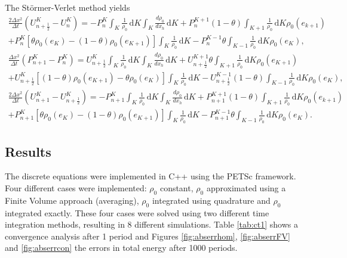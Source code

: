 \documentclass{article}
\begin{document}
The St\"{o}rmer-Verlet method yields
\begin{equation}
	\begin{aligned}
		\frac{2 \Delta x^2}{\Delta t} \left(U_{n+\frac{1}{2}}^K-U_n^K\right) = -P^K_n  \int_K \! \frac{1}{\rho_0} \, \mathrm{d}K   \int_K \! \frac{d \rho_0}{d x_h} \, \mathrm{d}K + P^{K+1}_n (1-\theta) \int_{K+1} \! \frac{1}{\rho_0} \, \mathrm{d}K \rho_0(e_{k+1}) \\
		+ P^K_n [\theta \rho_0(e_K) - (1-\theta) \rho_0(e_{K+1})] \int_K \! \frac{1}{\rho_0} \, \mathrm{d}K - P^{K-1}_n \theta \int_{K-1} \! \frac{1}{\rho_0} \, \mathrm{d}K \rho_0(e_K), \\
		\frac{\Delta x^2}{\Delta t} \left(P_{n+1}^K-P_n^K\right) = U^K_{n+\frac{1}{2}} \int_K \! \frac{1}{\rho_0} \, \mathrm{d}K   \int_K \! \frac{d \rho_0}{d x_h} \, \mathrm{d}K + U^{K+1}_{n+\frac{1}{2}} \theta \int_{K+1} \! \frac{1}{\rho_0} \, \mathrm{d}K \rho_0(e_{K+1}) \\
		+ U^K_{n+\frac{1}{2}} [(1-\theta) \rho_0(e_{K+1}) - \theta \rho_0(e_K)] \int_K \! \frac{1}{\rho_0} \, \mathrm{d}K - U^{K-1}_{n+\frac{1}{2}} (1-\theta) \int_{K-1} \! \frac{1}{\rho_0} \, \mathrm{d}K \rho_0(e_K), \\
	\frac{2 \Delta x^2}{\Delta t} \left(U_{n+1}^K-U_{n+\frac{1}{2}}^K\right) = -P^K_{n+1}  \int_K \! \frac{1}{\rho_0} \, \mathrm{d}K   \int_K \! \frac{d \rho_0}{d x_h} \, \mathrm{d}K + P^{K+1}_{n+1} (1-\theta) \int_{K+1} \! \frac{1}{\rho_0} \, \mathrm{d}K \rho_0(e_{k+1}) \\
		+ P^K_{n+1} [\theta \rho_0(e_K) - (1-\theta) \rho_0(e_{K+1})] \int_K \! \frac{1}{\rho_0} \, \mathrm{d}K - P^{K-1}_{n+1} \theta \int_{K-1} \! \frac{1}{\rho_0} \, \mathrm{d}K \rho_0(e_K).	
	\end{aligned}
\end{equation}

\subsection{Results}
The discrete equations were implemented in C++ using the PETSc framework. Four different cases were implemented: $\rho_0$ constant, $\rho_0$ approximated using a Finite Volume approach (averaging), $\rho_0$ integrated using quadrature and $\rho_0$ integrated exactly. These four cases were solved using two different time integration methods, resulting in 8 different simulations. Table \ref{tab:ct1} shows a convergence analysis after 1 period and Figures \ref{fig:abserrhom}, \ref{fig:abserrFV} and \ref{fig:abserrcon} the errors in total energy after 1000 periods.
\end{document}
